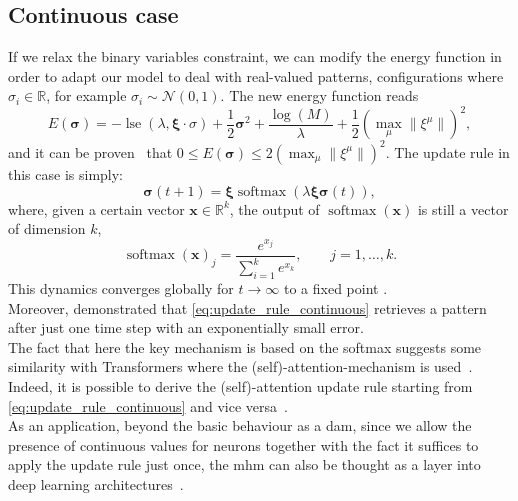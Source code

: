 \documentclass[\rootdir/main.tex]{subfiles}
\begin{document}
\subsection{Continuous case}
If we relax the binary variables constraint, we can modify the energy function in order to adapt our model to deal with real-valued patterns, \ie configurations where $\sigma_i \in \mathbb{R}$, for example $\sigma_i \sim \mathcal{N}(0,1)$.
The new energy function reads
\begin{equation}\label{eq:continuous_energy}
    E\left(\symbf{\sigma} \right) = - \operatorname{lse}
    \left( \lambda, \symbf{\xi} \cdot \sigma \right) + \frac{1}{2} \symbf{\sigma}^2 + \frac{\operatorname{log}(M)}{\lambda} + \frac{1}{2}\left(\operatorname{max}_{\mu}\| \xi^{\mu}\|\right)^2,
\end{equation}
and it can be proven~\parencite{hopfield_is_all_you_need} that $0 \leq E\left(\symbf{\sigma} \right) \leq 2\left(\operatorname{max}_{\mu}\| \xi^{\mu}\|\right)^2$.
The update rule in this case is simply:
\begin{equation}\label{eq:update_rule_continuous}
    \symbf{\sigma}(t + 1) = \symbf{\xi} \operatorname{softmax}(\lambda \symbf{\xi} \symbf{\sigma}(t)),
\end{equation}
where, given a certain vector $\symbf{x} \in \mathbb{R}^k$, the output of $\operatorname{softmax}(\symbf{x})$ is still a vector of dimension $k$,
\begin{equation}
    \operatorname{softmax}(\symbf{x})_j = \frac{e^{x_j}}{\sum_{i = 1}^k e^{x_k}}, \qquad j = 1,\dots,k. 
\end{equation}
This dynamics converges globally for $t \to \infty$ to a fixed point \cite{hopfield_is_all_you_need, cccp, rangarajan}.\\
Moreover, \citeauthor{hopfield_is_all_you_need} demonstrated that \cref{eq:update_rule_continuous} retrieves a pattern after just one time step with an exponentially small error.\\
The fact that here the key mechanism is based on the softmax suggests some similarity with Transformers where the (self)-attention-mechanism is used~\cite{attention}. Indeed, it is possible to derive the (self)-attention update rule starting from \cref{eq:update_rule_continuous} and vice versa~\cite{hopfield_is_all_you_need}.\\
As an application, beyond the basic behaviour as a \acrlong{dam}, since we allow the presence of continuous values for neurons together with the fact it suffices to apply the update rule just once, the \acrlong{mhm} can also be thought as a layer into deep learning architectures~\parencite[see][for details]{hopfield_is_all_you_need}.
\end{document}

